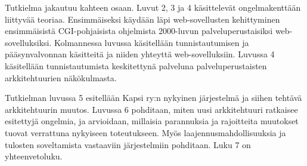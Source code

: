 Tutkielma jakautuu kahteen osaan. Luvut 2, 3 ja 4 käsittelevät ongelmakenttään liittyvää teoriaa. Ensimmäiseksi käydään läpi web-sovellusten kehittyminen ensimmäisistä CGI-pohjaisista ohjelmista 2000-luvun palveluperustaisiksi web-sovelluksiksi. Kolmannessa luvussa käsitellään tunnistautumisen ja pääsynvalvonnan käsitteitä ja niiden yhteyttä web-sovelluksiin. Luvussa 4 käsitellään tunnistautumista keskitettynä palveluna palveluperustaisten arkkitehtuurien näkökulmasta.

Tutkielman luvussa 5 esitellään Kapsi ry:n nykyinen järjestelmä ja siihen tehtävä arkkitehtuurin muutos. Luvussa 6 pohditaan, miten uusi arkkitehtuuri ratkaisee esitettyjä ongelmia, ja arvioidaan, millaisia parannuksia ja rajoitteita muutokset tuovat verrattuna nykyiseen toteutukseen. Myös laajennusmahdollisuuksia ja tulosten soveltamista vastaaviin järjestelmiin pohditaan. Luku 7 on yhteenvetoluku.